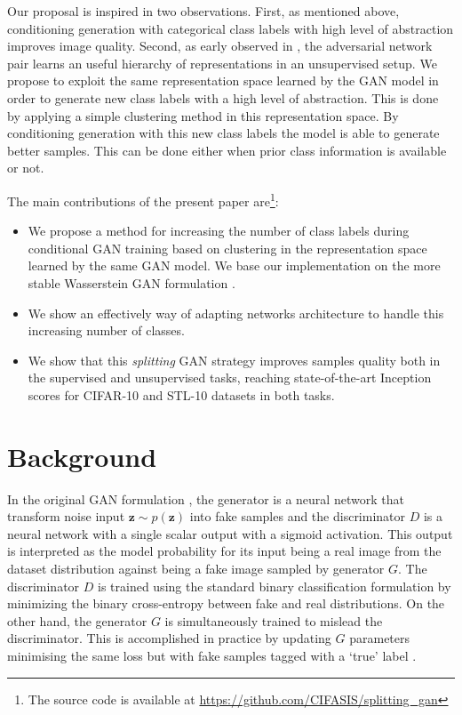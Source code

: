 \documentclass[times,twocolumn]{article}
\begin{document}
Our proposal is inspired in two observations. First, as mentioned above, conditioning generation with categorical class labels with high level of abstraction improves image quality. Second, as early observed in \cite{Goodfellow2014,Radford2015}, the adversarial network pair learns an useful hierarchy of representations in an unsupervised setup. We propose to exploit the same representation space learned by the GAN model in order to generate new class labels with a high level of abstraction. This is done by applying a simple clustering method in this representation space. By conditioning generation with this new class labels the model is able to generate better samples. This can be done either when prior class information is available or not.



The main contributions of the present paper are\footnote{The source code is available at \url{https://github.com/CIFASIS/splitting_gan}}:
\begin{itemize}
 \item We propose a method for increasing the number of class labels during conditional GAN training based on clustering in the representation space learned by the same GAN model. We base our implementation on the more stable Wasserstein GAN formulation \cite{Arjovsky2017b, Gulrajani2017}.
 \item We show an effectively way of adapting networks architecture to handle this increasing number of classes.
 \item We show that this \textit{splitting} GAN strategy improves samples quality both in the supervised and unsupervised tasks, reaching state-of-the-art Inception scores for CIFAR-10 and STL-10 datasets in both tasks.
\end{itemize}
\section{Background}
In the original GAN formulation \cite{Goodfellow2014}, the generator is a neural network that transform noise input $\bm{z} \sim p(\bm{z})$ into fake samples and the discriminator $D$ is a neural network with a single scalar output with a sigmoid activation. This output is interpreted as the model probability for its input being a real image from the dataset distribution against being a fake image sampled by generator $G$. The discriminator $D$ is trained using the standard binary classification formulation by minimizing the binary cross-entropy between fake and real distributions. On the other hand, the generator $G$ is simultaneously trained to mislead the discriminator. This is accomplished in practice by updating $G$ parameters minimising the same loss but with fake samples tagged with a `true' label \cite{Goodfellow2014}. 
\end{document}
